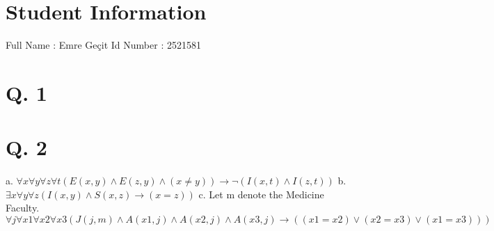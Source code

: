 \documentclass[11pt]{article}
\begin{document}
\section*{Student Information } 
Full Name :  Emre Geçit\newline
Id Number :  2521581

\section*{Q. 1}
\begin{center}
\begin{fitchproof}
\end{fitchproof}
\end{center}
\noindent
\newline

\section*{Q. 2}
a. $\forall x \forall y \forall z \forall t (E(x,y) \wedge E(z,y) \wedge (x \neq y)) \rightarrow \neg (I(x,t) \wedge I(z,t))$\newline
b. $\exists x\forall y\forall z (I(x, y) \wedge S(x, z) \rightarrow (x=z)) $\newline
c. Let m denote the Medicine Faculty.\newline
$\forall j \forall x1 \forall x2 \forall x3 (J(j, m) \wedge  A(x1, j) \wedge A(x2, j) \wedge A(x3, j) \rightarrow ((x1=x2) \lor (x2=x3) \lor (x1=x3)))$
\end{document}
